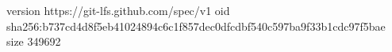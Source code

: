 version https://git-lfs.github.com/spec/v1
oid sha256:b737cd4d8f5eb41024894c6c1f857dec0dfcdbf540c597ba9f33b1cdc97f5bae
size 349692
